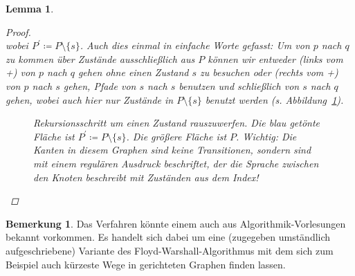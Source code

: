 \documentclass[11pt, a4paper]{article}
\theoremstyle{definition}
\newtheorem*{remark*}{Bemerkung}
\theoremstyle{plain}
\newtheorem{lemma}[definition]{Lemma}
\numberwithin{equation}{section}
\begin{document}
\begin{lemma}
\begin{proof}
$$		$$
wobei $P^\prime \coloneqq P \setminus \{ s \}$. Auch dies einmal in einfache Worte gefasst: Um von $p$ nach $q$ zu kommen über Zustände ausschließlich aus $P$ können wir entweder (links vom +) von $p$ nach $q$ gehen ohne einen Zustand $s$ zu besuchen oder (rechts vom +) von $p$ nach $s$ gehen, Pfade von $s$ nach $s$ benutzen und schließlich von $s$ nach $q$ gehen, wobei auch hier nur Zustände in $P \setminus \{ s \}$ benutzt werden (s. Abbildung~\ref{fig:state_elimination}).
		\begin{figure}
			\centering
			
			\caption{Rekursionsschritt um einen Zustand rauszuwerfen. Die blau getönte Fläche ist $P^\prime \coloneqq P \setminus \{ s \}$. Die größere Fläche ist $P$. Wichtig: Die Kanten in diesem Graphen sind keine Transitionen, sondern sind mit einem regulären Ausdruck beschriftet, der die Sprache zwischen den Knoten beschreibt mit Zuständen aus dem Index!}
			\label{fig:state_elimination}
		\end{figure}
	\end{proof}
\end{lemma}
\begin{remark*}
	Das Verfahren könnte einem auch aus Algorithmik-Vor\-le\-sung\-en bekannt vorkommen. Es handelt sich dabei um eine (zugegeben umständlich aufgeschriebene) Variante des Floyd-Warshall-Algorithmus mit dem sich zum Beispiel auch kürzeste Wege in gerichteten Graphen finden lassen.
\end{remark*}
\end{document}
